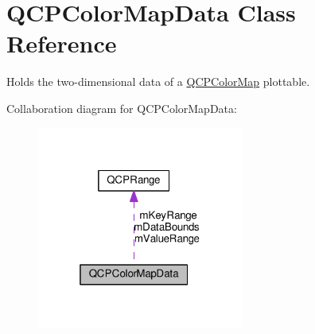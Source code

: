 \hypertarget{class_q_c_p_color_map_data}{}\section{Q\+C\+P\+Color\+Map\+Data Class Reference}
\label{class_q_c_p_color_map_data}


Holds the two-\/dimensional data of a \hyperlink{class_q_c_p_color_map}{Q\+C\+P\+Color\+Map} plottable.  




Collaboration diagram for Q\+C\+P\+Color\+Map\+Data\+:\nopagebreak
\begin{figure}[H]
\begin{center}
\leavevmode
\includegraphics[width=193pt]{class_q_c_p_color_map_data__coll__graph}
\end{center}
\end{figure}
